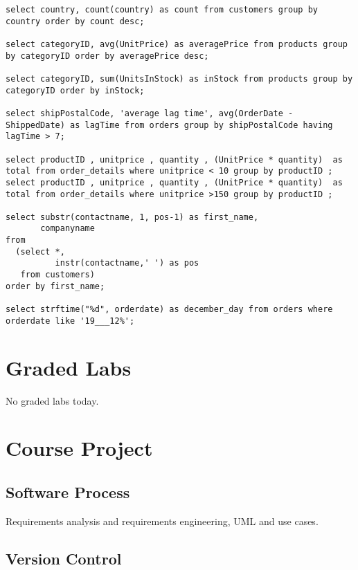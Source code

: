 \documentclass{article}
\begin{document}
    \begin{lstlisting}
select country, count(country) as count from customers group by country order by count desc;

select categoryID, avg(UnitPrice) as averagePrice from products group by categoryID order by averagePrice desc; 

select categoryID, sum(UnitsInStock) as inStock from products group by categoryID order by inStock;

select shipPostalCode, 'average lag time', avg(OrderDate - ShippedDate) as lagTime from orders group by shipPostalCode having lagTime > 7;

select productID , unitprice , quantity , (UnitPrice * quantity)  as total from order_details where unitprice < 10 group by productID ;
select productID , unitprice , quantity , (UnitPrice * quantity)  as total from order_details where unitprice >150 group by productID ;

select substr(contactname, 1, pos-1) as first_name,
       companyname
from
  (select *,
          instr(contactname,' ') as pos
   from customers)
order by first_name;

select strftime("%d", orderdate) as december_day from orders where orderdate like '19___12%';
    \end{lstlisting}


    \section{Graded Labs}

    No graded labs today.


    \section{Course Project}


        \subsection{Software Process}

        Requirements analysis and requirements engineering, UML and use cases.
        
        \subsection{Version Control}
\end{document}
